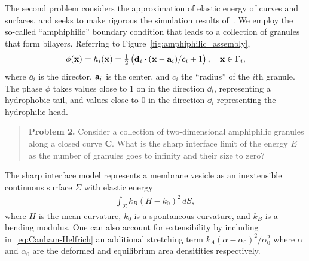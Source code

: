 The second problem considers the approximation of elastic energy of
curves and surfaces, and seeks to make rigorous the simulation results
of~\cite{FuQuRyYo22, Fu2018_SIAM}. We employ the so-called
``amphiphilic'' boundary condition that leads to a collection of
granules that form bilayers. Referring to
Figure~\ref{fig:amphiphilic_assembly}, 
\begin{align}
\label{eq:amphiphilic_BC}
  \phi(\xx) = h_i(\xx) = \tfrac{1}{2}\left(\dd_i \cdot 
    (\xx - \aa_i)/c_i + 1\right), \quad \xx \in \Gamma_i,
\end{align}
where $\dd_i$ is the director, $\aa_i$ is the center, and $c_i$ the
``radius'' of the $i$th granule. The phase $\phi$ takes values close to
$1$ on in the direction $\dd_i$, representing a hydrophobic tail, and
values close to $0$ in the direction $\dd_i$ representing the
hydrophilic head.

\begin{quotation}
  \noindent
  \textbf{Problem 2.}
  Consider a collection of two-dimensional amphiphilic granules along a
  closed curve $\mathbf{C}$. What is the sharp interface limit of the
  energy $E$ as the number of granules goes to infinity and their size
  to zero?
\end{quotation}
The sharp interface model represents a membrane vesicle as an
inextensible continuous surface $\Sigma$ with elastic energy
\begin{align}
  \label{eq:Canham-Helfrich}
  \int_{\Sigma} k_B(H - k_0)^2\, dS,
\end{align}
where $H$ is the mean curvature, $k_0$ is a spontaneous curvature, and
$k_B$ is a bending modulus. One can also account for extensibility by
including in~\eqref{eq:Canham-Helfrich} an additional stretching term
$k_A(\alpha - \alpha_0)^2/\alpha_0^2$ where $\alpha$ and $\alpha_0$ are
the deformed and equilibrium area densitities respectively.

